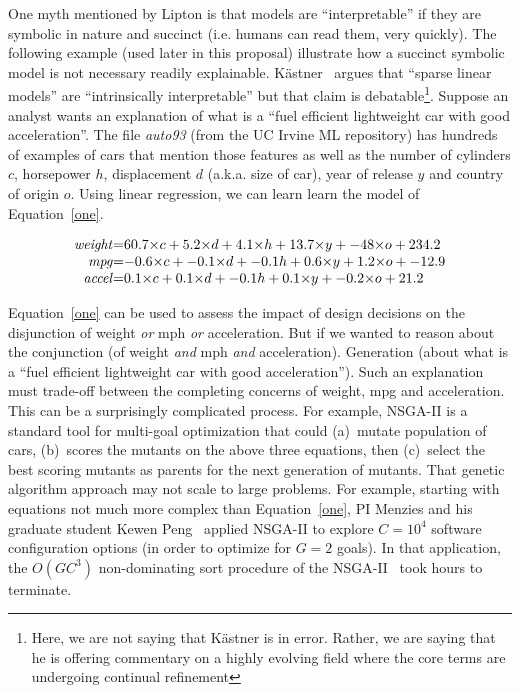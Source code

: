 
 One myth   mentioned
 by Lipton is that   models are ``interpretable'' if they are 
 symbolic in nature and succinct 
 (i.e. humans can read them, very quickly).
The following example  (used later in this proposal)
illustrate how a succinct symbolic model is not necessary readily explainable.
K\"astner~\cite{kastner21} argues that ``sparse linear models'' are ``intrinsically interpretable'' but that
 claim is debatable\footnote{Here, we are not saying
 that K\"astner is in error. Rather, we are saying
 that he is offering commentary on a highly evolving field where the core terms are undergoing 
 continual refinement}. 
 Suppose an analyst wants an explanation
 of what is a ``fuel efficient lightweight car with good acceleration''. The file
{\em auto93} (from the UC Irvine ML
  repository) has hundreds of examples of cars that mention those features as well as the number of cylinders $c$, horsepower $h$, 
displacement $d$ (a.k.a. size of car), year of release $y$ and country of origin $o$.
Using linear regression, we can learn learn the model of Equation~\ref{one}.
 
 
\begin{figure}
{\footnotesize
\begin{equation}\label{one}
\begin{array}{r@{=}l} 
  \mathit{weight} &
 60.7{\times}c +
      5.2{\times}d +
      4.1{\times}h +
     13.7{\times}y +
    -48{\times}o +
    234.2 \\     
  \mathit{mpg} &
     -0.6{\times}c +
     -0.1{\times}d +
     -0.1h +
      0.6{\times}y +
      1.2{\times}o +
     -12.9 \\   
 \mathit{accel} &
      0.1{\times}c +
      0.1{\times}d +
     -0.1h +
      0.1{\times}y +
     -0.2{\times}o +
     21.2\end{array} \end{equation}
     }
  \end{figure} 
   
  Equation~\ref{one}  can be used
  to assess the impact of design decisions
  on the disjunction of 
    weight {\em or} mph  {\em or}  acceleration.
    But if we wanted to reason about
    the conjunction
    (of
     weight {\em and} mph  {\em and}  acceleration).
 Generation 
(about what is a  ``fuel efficient lightweight car with good acceleration'').
Such an explanation must trade-off between the completing concerns
of weight, mpg and acceleration. This can be a
surprisingly complicated process.
For example, NSGA-II is a standard tool for
multi-goal optimization that  could
(a)~mutate population of cars,   (b)~scores the mutants
on the above three equations, then (c)~select the best scoring mutants as parents for
the next generation of mutants.
That genetic algorithm approach may not scale to large problems.
For example, starting with equations not much more complex than Equation~\ref{one},
PI Menzies and his graduate student
Kewen Peng~\cite{kewen21} applied
NSGA-II to explore $C=10^4$ software configuration options
(in order to optimize for $G=2$ goals). In that application,
the $O(GC^3)$ non-dominating sort procedure of the NSGA-II~\cite{deb02}   took hours to terminate.  

